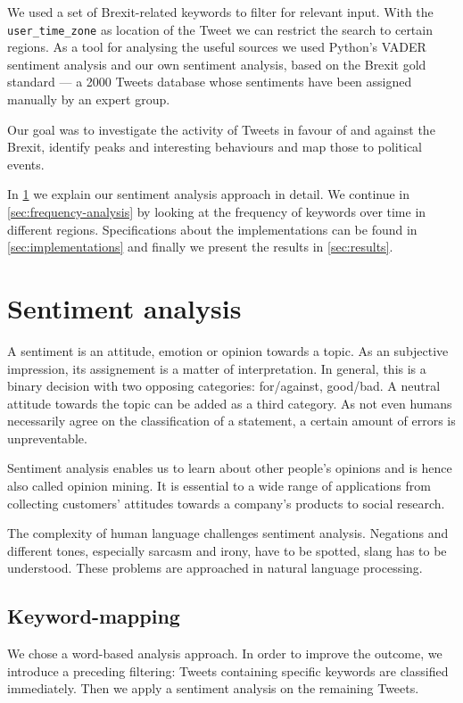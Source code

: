 \documentclass{emulateapj}
\begin{document}
We used a set of Brexit-related keywords to filter for relevant input. With the \texttt{user\_time\_zone} as location of the Tweet we can restrict the search to certain regions. 
As a tool for analysing the useful sources we used Python's VADER\cite{vader-paper, vader-code} sentiment analysis and our own sentiment analysis, based on the Brexit gold standard\cite{ssix}
--- a 2000 Tweets database whose sentiments have been assigned manually by an expert group.

Our goal was to investigate the activity of Tweets in favour of and against the Brexit, identify peaks and interesting behaviours and map those to political events. 

In \ref{sec:sentiment-analysis} we explain our sentiment analysis approach in detail.  
We continue in \ref{sec:frequency-analysis} by looking at the frequency of keywords over time in different regions.
Specifications about the implementations can be found in \ref{sec:implementations} and finally we present the
results in \ref{sec:results}.

\section{Sentiment analysis}\label{sec:sentiment-analysis}
A sentiment is an attitude, emotion or opinion towards a topic.
As an subjective impression, its assignement is a matter of interpretation. %
In general, this is a binary decision with two opposing categories: for/against, good/bad.
A neutral attitude towards the topic can be added as a third category.
As not even humans necessarily agree on the classification of a statement, a certain amount of errors is unpreventable.

Sentiment analysis enables us to learn about other people's opinions and is hence also called opinion mining.
It is essential to a wide range of applications
from collecting customers' attitudes towards a company's products to social research.

The complexity of human language challenges sentiment analysis. 
Negations and different tones, especially sarcasm and irony, have to be spotted, slang has to be understood.
These problems are approached in natural language processing.

\subsection{Keyword-mapping}
We chose a word-based analysis approach. 
In order to improve the outcome, we introduce a preceding filtering: Tweets containing specific keywords are classified immediately.
Then we apply a sentiment analysis on the remaining Tweets. 
\end{document}
